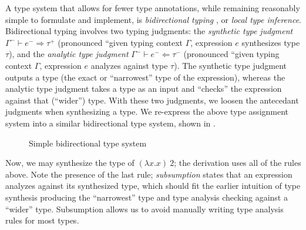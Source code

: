 A type system that allows for fewer type annotations, while remaining reasonably simple to formulate and implement, is \textit{bidirectional typing} \cite{Dunfield_2022,chlipala2005strict,pierce2000local}, or \textit{local type inference}. Bidirectional typing involves two typing judgments: the \textit{synthetic type judgment} $\Gamma^-\vdash e^-\Rightarrow\tau^+$ (pronounced ``given typing context $\Gamma$, expression $e$ synthesizes type $\tau$), and the \textit{analytic type judgment} $\Gamma^-\vdash e^-\Leftarrow\tau^-$ (pronounced ``given typing context $\Gamma$, expression $e$ analyzes against type $\tau$). The synthetic type judgment outputs a type (the exact or ``narrowest'' type of the expression), whereas the analytic type judgment takes a type as an input and ``checks'' the expression against that (``wider'') type. With these two judgments, we loosen the antecedant judgments when synthesizing a type. We re-express the above type assignment system into a similar bidirectional type system, shown in .

\begin{figure}
  \centering
  \begin{mdframed}
    \begin{singlespace}
    \end{singlespace}
  \end{mdframed}
  \caption{Simple bidirectional type system}
  \label{fig:bidirectional-typing}
\end{figure}

Now, we may synthesize the type of $(\lambda x.x)\ 2$; the derivation uses all of the rules above. Note the presence of the last rule; \textit{subsumption} states that an expression analyzes against its synthesized type, which should fit the earlier intuition of type synthesis producing the ``narrowest'' type and type analysis checking against a ``wider'' type. Subsumption allows us to avoid manually writing type analysis rules for most types.

